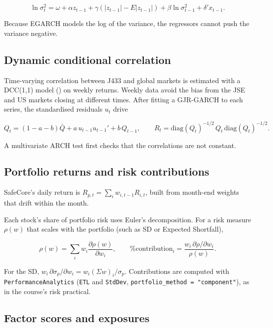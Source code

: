 \documentclass[11pt,preprint]{elsarticle}
\numberwithin{equation}{section}
\numberwithin{figure}{section}
\numberwithin{table}{section}
\begin{document}
\[
\ln\sigma_t^2 = \omega + \alpha z_{t-1} + \gamma\left(|z_{t-1}| - E|z_{t-1}|\right) + \beta\ln\sigma_{t-1}^2 + \delta' x_{t-1}.
\]

Because EGARCH models the log of the variance, the regressors cannot
push the variance negative.

\subsection{Dynamic conditional
correlation}\label{dynamic-conditional-correlation}

Time-varying correlation between J433 and global markets is estimated
with a DCC(1,1) model () on
weekly returns. Weekly data avoid the bias from the JSE and US markets
closing at different times. After fitting a GJR-GARCH to each series,
the standardised residuals \(u_t\) drive

\[
Q_t = (1-a-b)\bar{Q} + a\,u_{t-1}u_{t-1}' + b\,Q_{t-1},
\qquad
R_t = \text{diag}(Q_t)^{-1/2}\,Q_t\,\text{diag}(Q_t)^{-1/2}.
\]

A multivariate ARCH test first checks that the correlations are not
constant.

\subsection{Portfolio returns and risk
contributions}\label{portfolio-returns-and-risk-contributions}

SafeCore's daily return is \(R_{p,t} = \sum_i w_{i,t-1}R_{i,t}\), built
from month-end weights that drift within the month.

Each stock's share of portfolio risk uses Euler's decomposition. For a
risk measure \(\rho(w)\) that scales with the portfolio (such as SD or
Expected Shortfall),

\[
\rho(w) = \sum_i w_i \frac{\partial\rho(w)}{\partial w_i},
\qquad
\text{\% contribution}_i = \frac{w_i\,\partial\rho/\partial w_i}{\rho(w)}.
\]

For the SD,
\(w_i\,\partial\sigma_p/\partial w_i = w_i(\Sigma w)_i/\sigma_p\).
Contributions are computed with \texttt{PerformanceAnalytics}
(\texttt{ETL} and \texttt{StdDev},
\texttt{portfolio\_method\ =\ "component"}), as in the course's risk
practical.

\subsection{Factor scores and
exposures}\label{factor-scores-and-exposures}
\end{document}
